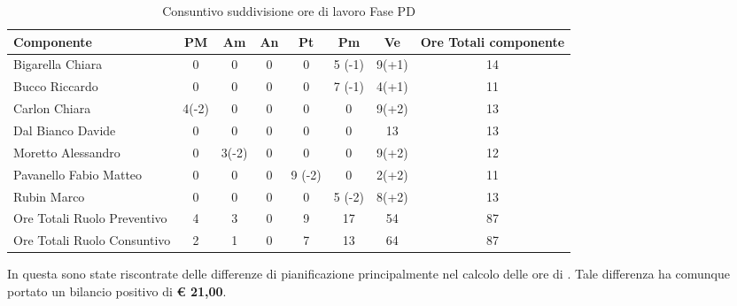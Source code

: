 			\begin{table}[H]
				\begin{center}
					\begin{tabular}{| l | c | c | c | c | c | c | c |}
						\hline
						Componente 					& PM	& Am 	& An 	& Pt 		& Pm 	& Ve 		& Ore Totali componente \\ \hline
						
						Bigarella Chiara 			& 0		& 0		& 0		& 0		& 5 (-1)		& 9(+1) 	& 14 \\
						Bucco Riccardo 				& 0		& 0		& 0		& 0		& 7 (-1)			& 4(+1) 		& 11 \\
						Carlon Chiara				& 4(-2) 	& 0		& 0		& 0		& 0			& 9(+2) 		& 13\\
						Dal Bianco Davide 			& 0		& 0		& 0		& 0		& 0			& 13 		& 13  \\
						Moretto Alessandro 			& 0		& 3(-2) 	& 0		& 0		& 0			& 9(+2)		& 12 \\
						Pavanello Fabio Matteo		& 0		& 0		& 0		& 9 (-2) 	& 0			& 2(+2)		& 11  \\
						Rubin Marco					& 0		& 0		& 0		& 0		& 5 (-2) 		& 8(+2)		& 13 \\ \hline \hline
						
						Ore Totali Ruolo Preventivo 			& 4 	& 3 	& 0		& 9 	& 17 		& 54 		& 87\\
						Ore Totali Ruolo Consuntivo 			& 2 	& 1 	& 0		& 7 	& 13 		& 64 		& 87\\ \hline
					\end{tabular}
				\end{center}
				\caption{Consuntivo suddivisione ore di lavoro Fase PD}
			\end{table}

		In questa  sono state riscontrate delle differenze di pianificazione principalmente nel calcolo delle ore di . Tale differenza ha comunque portato un bilancio positivo di \textbf{\euro{} 21,00}.
	
	